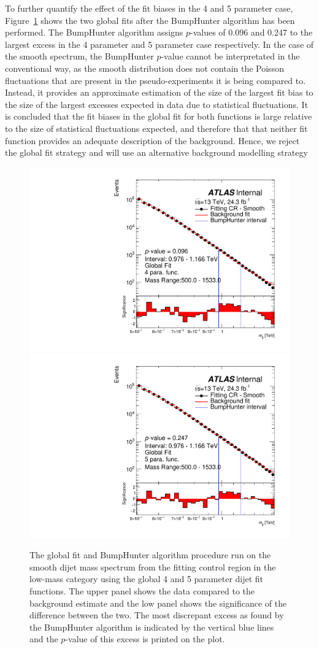 To further quantify the effect of the fit biases in the 4 and 5 parameter case,
Figure~\ref{fig:bhFit_lm_global} shows the two global fits after the {\sc BumpHunter} algorithm has been performed.
The {\sc BumpHunter} algorithm assigns \mbox{$p$-values} of 0.096 and 0.247 to the largest excess in the 4 parameter and 5 parameter case respectively.
In the case of the smooth spectrum, the {\sc BumpHunter} \mbox{$p$-value} cannot be interpretated in the conventional way,
as the smooth distribution does not contain the Poisson fluctuations that are present in the pseudo-experiments it is being compared to.
Instead, it provides an approximate estimation of the size of the largest fit bias to the size of the largest excesses expected in data due to statistical fluctuations.
It is concluded that the fit biases in the global fit for both functions is large relative to the size of statistical fluctuations expected,
and therefore that that neither fit function provides an adequate description of the background.
Hence, we reject the global fit strategy and will use an alternative background modelling strategy

\begin{figure}[!htb]
\captionsetup[subfigure]{aboveskip=0pt,justification=centering}
\centering
{} {
  \includegraphics[width=0.45\linewidth, angle=0]{figs/Dibjet/LowMass/FitStudy/globalFit_lm_bH_4para.pdf}
}
 {
  \includegraphics[width=0.45\linewidth, angle=0]{figs/Dibjet/LowMass/FitStudy/globalFit_lm_bH_5para.pdf}
}
\vspace{10pt}
\caption{\label{fig:bhFit_lm_global}
  The global fit and {\sc BumpHunter} algorithm procedure run on the smooth dijet mass spectrum from the fitting control region in the low-mass category
  using the global 4 and 5 parameter dijet fit functions.
  The upper panel shows the data compared to the background estimate and the low panel shows the significance of the difference between the two.
  The most discrepant excess as found by the {\sc BumpHunter} algorithm is indicated by the vertical blue lines and the \mbox{$p$-value} of this excess is printed on the plot. }
\end{figure}

